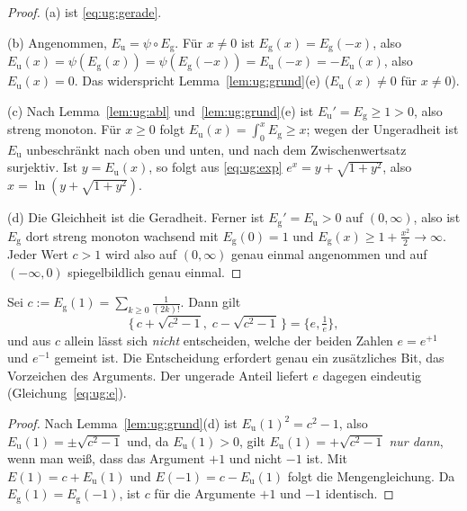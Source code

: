 \begin{proof}
(a) ist \eqref{eq:ug:gerade}.

(b) Angenommen, $E_{\mathrm u}=\psi\circ E_{\mathrm g}$. Für $x\ne0$ ist $E_{\mathrm g}(x)=E_{\mathrm g}(-x)$, also $E_{\mathrm u}(x)=\psi(E_{\mathrm g}(x))=\psi(E_{\mathrm g}(-x))=E_{\mathrm u}(-x)=-E_{\mathrm u}(x)$, also $E_{\mathrm u}(x)=0$. Das widerspricht Lemma~\ref{lem:ug:grund}(e) ($E_{\mathrm u}(x)\ne0$ für $x\neq0$).

(c) Nach Lemma~\ref{lem:ug:abl} und~\ref{lem:ug:grund}(e) ist $E_{\mathrm u}'=E_{\mathrm g}\ge1>0$, also streng monoton. Für $x\ge0$ folgt $E_{\mathrm u}(x)=\int_0^xE_{\mathrm g}\ge x$; wegen der Ungeradheit ist $E_{\mathrm u}$ unbeschränkt nach oben und unten, und nach dem Zwischenwertsatz surjektiv. Ist $y=E_{\mathrm u}(x)$, so folgt aus \eqref{eq:ug:exp} $e^x=y+\sqrt{1+y^2}$, also $x=\ln(y+\sqrt{1+y^2})$.

(d) Die Gleichheit ist die Geradheit. Ferner ist $E_{\mathrm g}'=E_{\mathrm u}>0$ auf $(0,\infty)$, also ist $E_{\mathrm g}$ dort streng monoton wachsend mit $E_{\mathrm g}(0)=1$ und $E_{\mathrm g}(x)\ge1+\tfrac{x^2}{2}\to\infty$. Jeder Wert $c>1$ wird also auf $(0,\infty)$ genau einmal angenommen und auf $(-\infty,0)$ spiegelbildlich genau einmal.
\end{proof}

\begin{korollar}\label{kor:ug:invers}
Sei $c:=E_{\mathrm g}(1)=\sum_{k\ge0}\frac1{(2k)!}$. Dann gilt
\[
\big\{\,c+\sqrt{c^2-1},\;c-\sqrt{c^2-1}\,\big\}=\Big\{e,\tfrac1e\Big\},
\]
und aus $c$ allein lässt sich \emph{nicht} entscheiden, welche der beiden Zahlen $e=e^{+1}$ und $e^{-1}$ gemeint ist. Die Entscheidung erfordert genau ein zusätzliches Bit, das Vorzeichen des Arguments. Der ungerade Anteil liefert $e$ dagegen eindeutig (Gleichung~\eqref{eq:ug:e}).
\end{korollar}

\begin{proof}
Nach Lemma~\ref{lem:ug:grund}(d) ist $E_{\mathrm u}(1)^2=c^2-1$, also $E_{\mathrm u}(1)=\pm\sqrt{c^2-1}$ und, da $E_{\mathrm u}(1)>0$, gilt $E_{\mathrm u}(1)=+\sqrt{c^2-1}$ \emph{nur dann}, wenn man weiß, dass das Argument $+1$ und nicht $-1$ ist. Mit $E(1)=c+E_{\mathrm u}(1)$ und $E(-1)=c-E_{\mathrm u}(1)$ folgt die Mengengleichung. Da $E_{\mathrm g}(1)=E_{\mathrm g}(-1)$, ist $c$ für die Argumente $+1$ und $-1$ identisch.
\end{proof}

